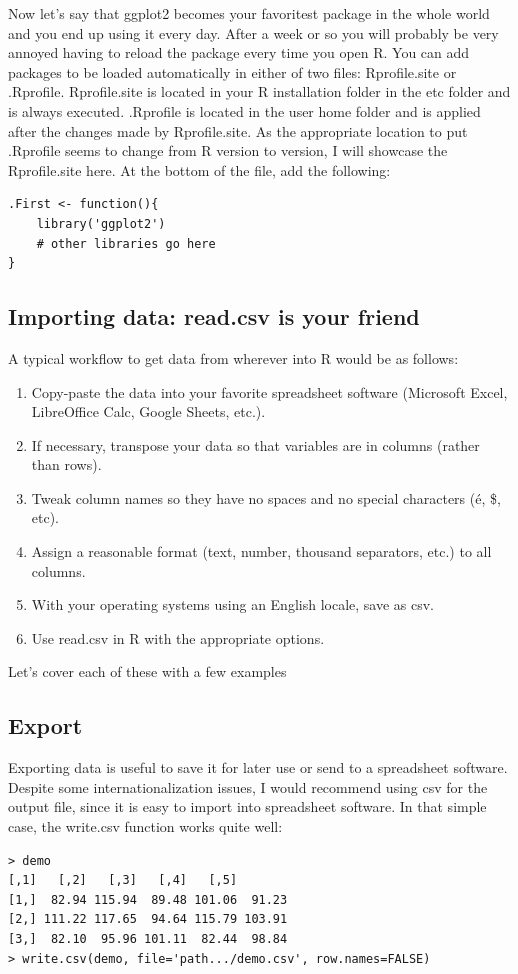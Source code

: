 \documentclass{report}
\newcommand{\code}[1]{\textsf{\ttfamily #1}}
\begin{document}
		Now let's say that \code{ggplot2} becomes your favoritest package in the whole world and you end up using it every day. After a week or so you will probably be very annoyed having to reload the package every time you open R. You can add packages to be loaded automatically in either of two files: \code{Rprofile.site} or \code{.Rprofile}. \code{Rprofile.site} is located in your R installation folder in the etc folder and is always executed. \code{.Rprofile} is located in the user home folder and is applied after the changes made by \code{Rprofile.site}. As the appropriate location to put \code{.Rprofile} seems to change from R version to version, I will showcase the \code{Rprofile.site} here. At the bottom of the file, add the following:
		\begin{verbatim}
.First <- function(){
	library('ggplot2')
	# other libraries go here
}
		\end{verbatim}
	
		\subsection{Importing data: \code{read.csv} is your friend}
		A typical workflow to get data from wherever into R would be as follows:
		\begin{enumerate}
			\item Copy-paste the data into your favorite spreadsheet software (Microsoft Excel, LibreOffice Calc, Google Sheets, etc.).
			\item If necessary, transpose your data so that variables are in columns (rather than rows).
			\item Tweak column names so they have no spaces and no special characters (é, \$, etc).
			\item Assign a reasonable format (text, number, thousand separators, etc.) to all columns.
			\item With your operating systems using an English locale, save as csv.
			\item Use \code{read.csv} in R with the appropriate options.
		\end{enumerate}
		Let's cover each of these with a few examples
	
		
		\subsection{Export}
		Exporting data is useful to save it for later use or send to a spreadsheet software. Despite some internationalization issues, I would recommend using csv for the output file, since it is easy to import into spreadsheet software. In that simple case, the \code{write.csv} function works quite well:
		\begin{verbatim}
> demo
[,1]   [,2]   [,3]   [,4]   [,5]
[1,]  82.94 115.94  89.48 101.06  91.23
[2,] 111.22 117.65  94.64 115.79 103.91
[3,]  82.10  95.96 101.11  82.44  98.84
> write.csv(demo, file='path.../demo.csv', row.names=FALSE)
		\end{verbatim}
		
\end{document}
